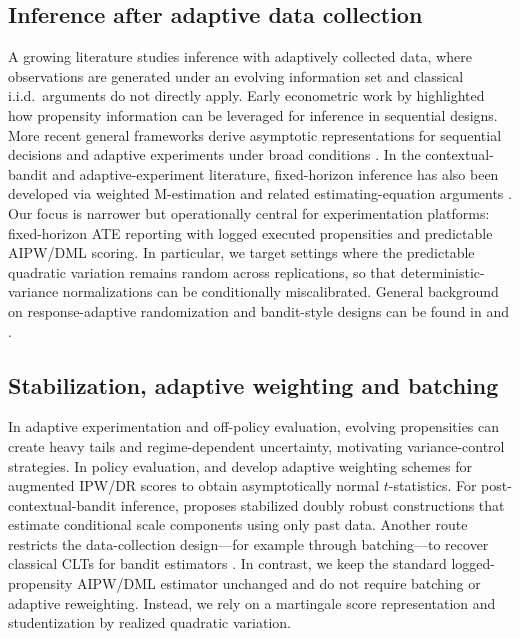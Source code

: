 \documentclass[11pt]{article}
\numberwithin{equation}{section}
\theoremstyle{plain}
\theoremstyle{definition}
\theoremstyle{remark}
\begin{document}
\subsection*{Inference after adaptive data collection}
A growing literature studies inference with adaptively collected data, where observations are generated under an evolving information set and classical i.i.d.\ arguments do not directly apply. Early econometric work by \citet{hahnHiranoKarlan2011} highlighted how propensity information can be leveraged for inference in sequential designs. More recent general frameworks derive asymptotic representations for sequential decisions and adaptive experiments under broad conditions \citep{hiranoPorter2023asymptotics}. In the contextual-bandit and adaptive-experiment literature, fixed-horizon inference has also been developed via weighted M-estimation and related estimating-equation arguments \citep{zhangJansonMurphy2021}. Our focus is narrower but operationally central for experimentation platforms: fixed-horizon ATE reporting with logged executed propensities and predictable AIPW/DML scoring. In particular, we target settings where the predictable quadratic variation remains random across replications, so that deterministic-variance normalizations can be conditionally miscalibrated. General background on response-adaptive randomization and bandit-style designs can be found in \citet{rosenberger2015randomization} and \citet{villar2015bandit}.

\subsection*{Stabilization, adaptive weighting and batching}
In adaptive experimentation and off-policy evaluation, evolving propensities can create heavy tails and regime-dependent uncertainty, motivating variance-control strategies. In policy evaluation, \citet{hadad2021confidence} and \citet{zhan2021off} develop adaptive weighting schemes for augmented IPW/DR scores to obtain asymptotically normal $t$-statistics. For post-contextual-bandit inference, \citet{bibaut2021post} proposes stabilized doubly robust constructions that estimate conditional scale components using only past data. Another route restricts the data-collection design---for example through batching---to recover classical CLTs for bandit estimators \citep{zhang2020large}. In contrast, we keep the standard logged-propensity AIPW/DML estimator unchanged and do not require batching or adaptive reweighting. Instead, we rely on a martingale score representation and studentization by realized quadratic variation.
\end{document}
